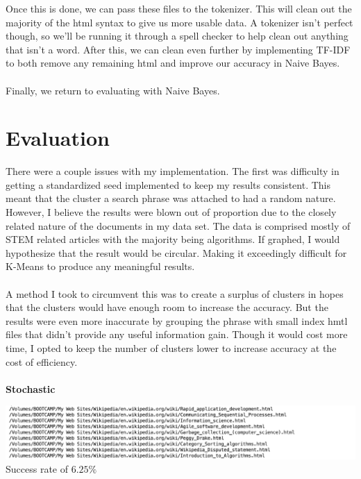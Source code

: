 \documentclass{article}
\begin{document}
\noindent
Once this is done, we can pass these files to the tokenizer. This will clean out the majority of the html syntax to give us more usable data. A tokenizer isn't perfect though, so we'll be running it through a spell checker to help clean out anything that isn't a word. After this, we can clean even further by implementing TF-IDF to both remove any remaining html and improve our accuracy in Naive Bayes. 
\\\\
Finally, we return to evaluating with Naive Bayes.


\section{Evaluation}
There were a couple issues with my implementation. The first was difficulty in getting a standardized seed implemented to keep my results consistent. This meant that the cluster a search phrase was attached to had a random nature. However, I believe the results were blown out of proportion due to the closely related nature of the documents in my data set. The data is comprised mostly of STEM related articles with the majority being algorithms. If graphed, I would hypothesize that the result would be circular. Making it exceedingly difficult for K-Means to produce any meaningful results. 
\\\\
A method I took to circumvent this was to create a surplus of clusters in hopes that the clusters would have enough room to increase the accuracy. But the results were even more inaccurate by grouping the phrase with small index hmtl files that didn't provide any useful information gain. Though it would cost more time, I opted to keep the number of clusters lower to increase accuracy at the cost of efficiency.
\\\\
\textbf{Stochastic}
\begin{center}
\includegraphics[scale=0.4]{Stochastic.png}\\
Success rate of $6.25\%$
\end{center}
\end{document}
